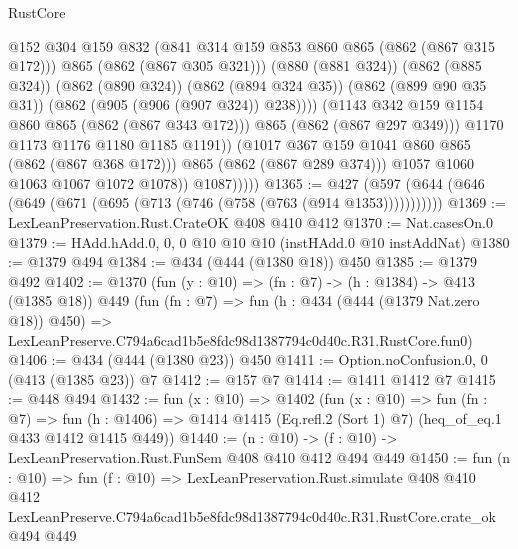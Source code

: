 \begin{lexlean}{RustCore}
\begin{coremodule}
                                @152
                                @304
                                @159
                                @832
                                (@841 @314 @159 @853 @860 @865 (@862 (@867 @315 @172)))
                                @865
                                (@862 (@867 @305 @321)))
                              (@880 (@881 @324))
                              (@862 (@885 @324))
                              (@862 (@890 @324))
                              (@862 (@894 @324 @35))
                              (@862 (@899 @90 @35 @31))
                              (@862 (@905 (@906 (@907 @324)) @238))))
                          (@1143 @342 @159 @1154 @860 @865 (@862 (@867 @343 @172)))
                          @865
                          (@862 (@867 @297 @349)))
                        @1170
                        @1173
                        @1176
                        @1180
                        @1185
                        @1191))
                    (@1017 @367 @159 @1041 @860 @865 (@862 (@867 @368 @172)))
                    @865
                    (@862 (@867 @289 @374)))
                  @1057
                  @1060
                  @1063
                  @1067
                  @1072
                  @1078))
              @1087)))))
@1365 := @427 (@597 (@644 (@646 (@649 (@671 (@695 (@713 (@746 (@758 (@763 (@914 @1353)))))))))))
@1369 := LexLeanPreservation.Rust.CrateOK @408 @410 @412
@1370 := Nat.casesOn.{0}
@1379 := HAdd.hAdd.{0, 0, 0} @10 @10 @10 (instHAdd.{0} @10 instAddNat)
@1380 := @1379 @494
@1384 := @434 (@444 (@1380 @18)) @450
@1385 := @1379 @492
@1402 := @1370
    (fun (y : @10) => (fn : @7) -> (h : @1384) -> @413 (@1385 @18))
    @449
    (fun (fn : @7) =>
    fun (h : @434 (@444 (@1379 Nat.zero @18)) @450) =>
    LexLeanPreserve.C794a6cad1b5e8fdc98d1387794c0d40c.R31.RustCore.fun0)
@1406 := @434 (@444 (@1380 @23)) @450
@1411 := Option.noConfusion.{0, 0} (@413 (@1385 @23)) @7
@1412 := @157 @7
@1414 := @1411 @1412 @7
@1415 := @448 @494
@1432 := fun (x : @10) =>
  @1402
    (fun (x : @10) =>
    fun (fn : @7) =>
    fun (h : @1406) => @1414 @1415 (Eq.refl.{2} (Sort 1) @7) (heq_of_eq.{1} @433 @1412 @1415 @449))
@1440 := (n : @10) -> (f : @10) -> LexLeanPreservation.Rust.FunSem @408 @410 @412 @494 @449
@1450 := fun (n : @10) =>
  fun (f : @10) =>
  LexLeanPreservation.Rust.simulate
    @408
    @410
    @412
    LexLeanPreserve.C794a6cad1b5e8fdc98d1387794c0d40c.R31.RustCore.crate_ok
    @494
    @449
\end{coremodule}
\end{lexlean}
